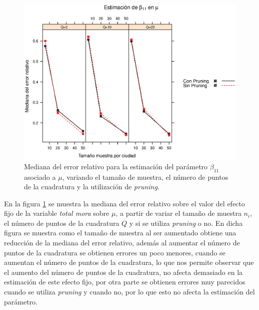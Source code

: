 \begin{figure}
	\begin{center}
		\includegraphics[scale=0.6]{MAPE_beta1_mu.eps}	
		\caption{Mediana del error relativo para la estimaci\'{o}n del par\'{a}metro $\beta_{11}$ asociado a $\mu$, variando el tama\~{n}o de muestra, el n\'{u}mero de puntos de la cuadratura y  la utilizaci\'{o}n de \textit{pruning}.}
		\label{MAPE_beta1_mu}
	\end{center}
\end{figure}

En la figura \ref{MAPE_beta1_mu} se muestra la mediana del error relativo sobre el valor del efecto fijo de la variable \textsl{total mora} sobre $\mu$, a partir de variar el tama\~{n}o de muestra $n_i$, el n\'{u}mero de puntos de la cuadratura $Q$ y si se utiliza \textit{pruning} o no. En dicha figura se muestra como el tama\~{n}o de muestra al ser aumentado obtiene una reducci\'{o}n de la mediana del error relativo, adem\'{a}s al aumentar el n\'{u}mero de puntos de la cuadratura se obtienen errores un poco menores, cuando se aumentan el n\'{u}mero de puntos de la cuadratura, lo que nos permite observar que el aumento del n\'{u}mero de puntos de la cuadratura, no afecta demasiado en la estimaci\'{o}n de este efecto fijo, por otra parte se obtienen errores muy parecidos cuando se utiliza \textit{pruning} y cuando no, por lo que esto no afecta la estimaci\'{o}n del par\'{a}metro.\\


